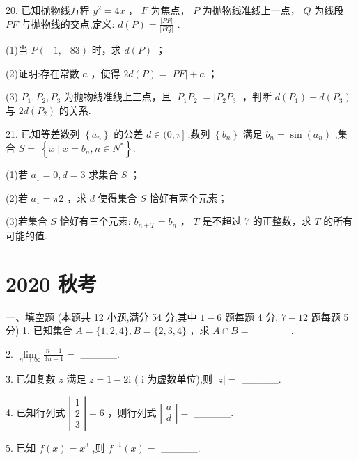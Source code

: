\documentclass[10pt]{article}
\begin{document}
20. 已知抛物线方程 \({y}^{2} = {4x}\) ， \(F\) 为焦点， \(P\) 为抛物线准线上一点， \(Q\) 为线段 \({PF}\) 与抛物线的交点,定义: \(d\left( P\right)  = \frac{\left| PF\right| }{\left| FQ\right| }\) .

(1)当 \(P\left( {-1, - {83}}\right)\) 时，求 \(d\left( P\right)\) ；

(2)证明:存在常数 \(a\) ，使得 \({2d}\left( P\right)  = \left| {PF}\right|  + a\) ；

(3) \({P}_{1},{P}_{2},{P}_{3}\) 为抛物线准线上三点，且 \(\left| {{P}_{1}{P}_{2}}\right|  = \left| {{P}_{2}{P}_{3}}\right|\) ，判断 \(d\left( {P}_{1}\right)  + d\left( {P}_{3}\right)\) 与 \({2d}\left( {P}_{2}\right)\) 的关系.

21. 已知等差数列 \(\left\{  {a}_{n}\right\}\) 的公差 \(d \in  (0,\pi \rbrack\) ,数列 \(\left\{  {b}_{n}\right\}\) 满足 \({b}_{n} = \sin \left( {a}_{n}\right)\) ,集合 \(S = \; \left\{  {x \mid  x = {b}_{n},n \in  {N}^{ * }}\right\}  .\)

(1)若 \({a}_{1} = 0,d = 3\) 求集合 \(S\) ；

(2)若 \({a}_{1} = {\pi 2}\) ，求 \(d\) 使得集合 \(S\) 恰好有两个元素；

(3)若集合 \(S\) 恰好有三个元素: \({b}_{n + T} = {b}_{n}\) ， \(T\) 是不超过 7 的正整数，求 \(T\) 的所有可能的值.

\section*{2020 秋考}

一、填空题 (本题共 12 小题,满分 54 分,其中 \(1 - 6\) 题每题 4 分, \(7 - {12}\) 题每题 5 分) 1. 已知集合 \(A = \{ 1,2,4\} ,B = \{ 2,3,4\}\) ，求 \(A \cap  B =\) \_\_\_\_\_.

2. \(\mathop{\lim }\limits_{{n \rightarrow  \infty }}\frac{n + 1}{{3n} - 1} =\) \_\_\_\_\_.

3. 已知复数 \(z\) 满足 \(z = 1 - 2\mathrm{i}\) ( \(\mathrm{i}\) 为虚数单位),则 \(\left| z\right|  =\) \_\_\_\_\_.

4. 已知行列式 \(\left| \begin{array}{l} 1 \\  2 \\  3 \end{array}\right|  = 6\) ，则行列式 \(\left| \begin{array}{l} a \\  d \end{array}\right|  =\) \_\_\_\_\_.

5. 已知 \(f\left( x\right)  = {x}^{3}\) ,则 \({f}^{-1}\left( x\right)  =\) \_\_\_\_\_.
\end{document}
